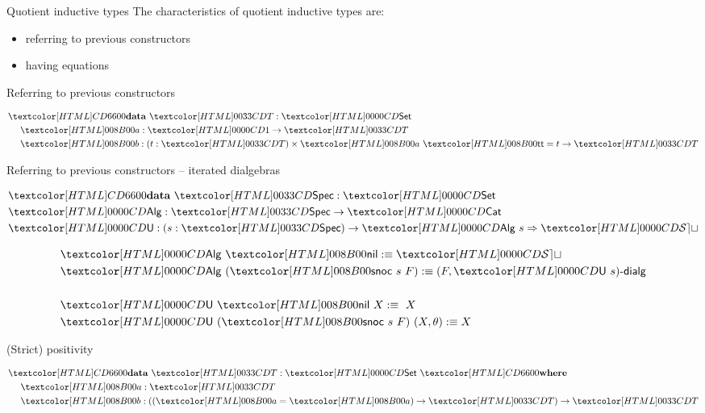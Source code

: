 \begin{frame}{Quotient inductive types}
  The characteristics of quotient inductive types are:

  \begin{itemize}
  \item referring to previous constructors
  \item having equations
  \end{itemize}
\end{frame}

\begin{frame}{Referring to previous constructors}
  
  \begin{align*}
    &\data\ \Tty : \Set \\
    &\ \ \ \ \Ta :\unitty \to \Tty \\
    &\ \ \ \ \Tb : (t : \Tty) \times \Ta\ \unitval = t \to \Tty
  \end{align*}

\end{frame}

\begin{frame}{Referring to previous constructors -- iterated dialgebras}

  \begin{align*}
    &\data\ \specty : \Set \\
    &\Alg : \specty \to \Cat \\
    &\Und : (s : \specty) \to \Func{\Alg\ s}{\SET}
  \end{align*}
  
  \begin{align*}
    &\Alg\ \specnil \ddefeq \SET \\
    &\Alg\ (\specsnoc\ s\ F) \ddefeq \dialgcat{F}{\Und\ s} \\
    \\
    &\Und\ \specnil\ X \ddefeq\ X \\
    &\Und\ (\specsnoc\ s\ F)\ (X,\theta) \ddefeq X
  \end{align*}

\end{frame}

\begin{frame}{(Strict) positivity}

  \begin{align*}
    &\data\ \Tty : \Set\ \where \\
    &\ \ \ \ \Ta : \Tty \\
    &\ \ \ \ \Tb : ((\Ta = \Ta) \to \Tty) \to \Tty
  \end{align*}
  
\end{frame}

